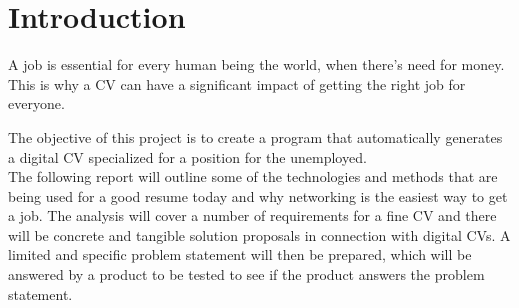 \section{Introduction}\label{sec:introduction}
A job is essential for every human being the world, when there's need for money. 
This is why a CV can have a significant impact of getting the right job for everyone.
 
The objective of this project is to create a program that automatically generates a digital CV 
specialized for a position for the unemployed. \\

The following report will outline some of the technologies and methods 
that are being used for a good resume today and why networking is the easiest way to get a job. 
The analysis will cover a number of requirements for a fine CV 
and there will be concrete and tangible solution proposals in connection with digital CVs. 
A limited and specific problem statement will then be prepared, 
which will be answered by a product to be tested to see if the product answers the problem statement.

\newpage

